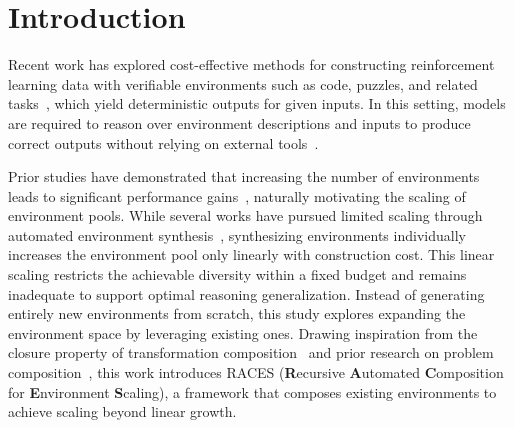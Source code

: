 \section{Introduction}
Recent work has explored cost-effective methods for constructing reinforcement learning data with verifiable environments such as code, puzzles, and related tasks~\citep{zeng2025rlvescalingreinforcementlearning, wang2026rlanythingforgeenvironmentpolicy}, which yield deterministic outputs for given inputs. In this setting, models are required to reason over environment descriptions and inputs to produce correct outputs without relying on external tools~\citep{jiang-etal-2025-logicpro, ding2025longreasonarenalongreasoningbenchmark}.

Prior studies have demonstrated that increasing the number of environments leads to significant performance gains~\citep{zeng2025rlvescalingreinforcementlearning}, naturally motivating the scaling of environment pools. While several works have pursued limited scaling through automated environment synthesis~\citep{xu2026scalersyntheticscalableadaptivelearning,he2026resyn}, synthesizing environments individually increases the environment pool only linearly with construction cost. This linear scaling restricts the achievable diversity within a fixed budget and remains inadequate to support optimal reasoning generalization. Instead of generating entirely new environments from scratch, this study explores expanding the environment space by leveraging existing ones. Drawing inspiration from the closure property of transformation composition~\citep{birkhoff2017survey} and prior research on problem composition~\citep{yuan2026from,pei-etal-2025-mathfusion,chen-etal-2024-sifo}, this work introduces RACES (\textbf{R}ecursive \textbf{A}utomated \textbf{C}omposition for \textbf{E}nvironment \textbf{S}caling), a framework that composes existing environments to achieve scaling beyond linear growth.

